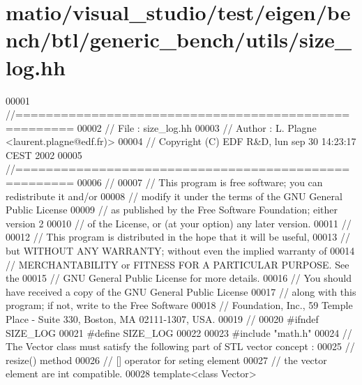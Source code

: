 \hypertarget{matio_2visual__studio_2test_2eigen_2bench_2btl_2generic__bench_2utils_2size__log_8hh_source}{}\section{matio/visual\+\_\+studio/test/eigen/bench/btl/generic\+\_\+bench/utils/size\+\_\+log.hh}
\label{matio_2visual__studio_2test_2eigen_2bench_2btl_2generic__bench_2utils_2size__log_8hh_source}

\begin{DoxyCode}
00001 \textcolor{comment}{//=====================================================}
00002 \textcolor{comment}{// File   :  size\_log.hh}
00003 \textcolor{comment}{// Author :  L. Plagne <laurent.plagne@edf.fr)>        }
00004 \textcolor{comment}{// Copyright (C) EDF R&D,  lun sep 30 14:23:17 CEST 2002}
00005 \textcolor{comment}{//=====================================================}
00006 \textcolor{comment}{// }
00007 \textcolor{comment}{// This program is free software; you can redistribute it and/or}
00008 \textcolor{comment}{// modify it under the terms of the GNU General Public License}
00009 \textcolor{comment}{// as published by the Free Software Foundation; either version 2}
00010 \textcolor{comment}{// of the License, or (at your option) any later version.}
00011 \textcolor{comment}{// }
00012 \textcolor{comment}{// This program is distributed in the hope that it will be useful,}
00013 \textcolor{comment}{// but WITHOUT ANY WARRANTY; without even the implied warranty of}
00014 \textcolor{comment}{// MERCHANTABILITY or FITNESS FOR A PARTICULAR PURPOSE.  See the}
00015 \textcolor{comment}{// GNU General Public License for more details.}
00016 \textcolor{comment}{// You should have received a copy of the GNU General Public License}
00017 \textcolor{comment}{// along with this program; if not, write to the Free Software}
00018 \textcolor{comment}{// Foundation, Inc., 59 Temple Place - Suite 330, Boston, MA  02111-1307, USA.}
00019 \textcolor{comment}{// }
00020 \textcolor{preprocessor}{#ifndef SIZE\_LOG}
00021 \textcolor{preprocessor}{#define SIZE\_LOG}
00022 
00023 \textcolor{preprocessor}{#include "math.h"}
00024 \textcolor{comment}{// The Vector class must satisfy the following part of STL vector concept :}
00025 \textcolor{comment}{//            resize() method}
00026 \textcolor{comment}{//            [] operator for seting element}
00027 \textcolor{comment}{// the vector element are int compatible.}
00028 \textcolor{keyword}{template}<\textcolor{keyword}{class} Vector>

\end{DoxyCode}
